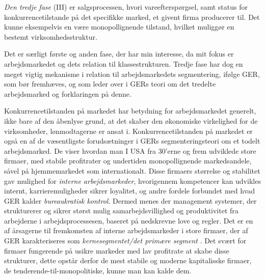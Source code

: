 \emph{Den tredje fase} (III) er salgsprocessen, hvori vareefterspørgsel,  samt status for konkurrencetilstande på det specifikke marked, et givent firma producerer til. Det kunne eksempelvis en være monopollignende tilstand, hvilket muliggør en bestemt virksomhedsstruktur. 

Det er særligt første og anden fase, der har min interesse, da mit fokus er arbejdsmarkedet og dets relation til klassestrukturen. Tredje fase har dog en meget vigtig mekanisme i relation til arbejdsmarkedets segmentering, ifølge GER, som bør fremhæves, og som leder over i GERs teori om det tredelte arbejdsmarked og forklaringen på denne.

Konkurrencetilstanden på markedet har betydning for arbejdsmarkedet generelt, ikke bare af den åbenlyse grund, at det skaber den økonomiske virkelighed for de virksomheder, lønmodtagerne er ansat i. Konkurrencetilstanden på markedet er også en af de væsentligste forudsætninger i GERs segmenteringsteori om et todelt arbejdsmarked. De viser hvordan man I USA fra 30'erne og frem udviklede store firmaer, med stabile profitrater og undertiden monopollignende markedsandele, såvel på hjemmemarkedet som internationalt. Disse firmaers størrelse og stabilitet gav mulighed for \emph{interne arbejdsmarkeder}, hvorigennem kompetencer kan udvikles internt, karrieremuligheder sikrer loyalitet, og andre fordele forbundet med hvad GER kalder \emph{bureaukratisk kontrol}. Dermed menes der management systemer, der strukturerer og sikrer størst mulig samarbejdsvillighed og produktivitet fra arbejderne i arbejdsprocessesen, baseret på nedskrevne love og regler. Det er en af årsagerne til fremkomsten af interne arbejdsmarkeder i store firmaer, der af GER karakteriseres som \emph{kernesegmentet/det primære segment} \parencite[187]{Gordon1982}. Det svært for firmaer fungerende på usikre markeder med lav profitrate at skabe disse strukturer, dette opstår derfor de mest stabile og moderne kapitalisske firmaer, de tenderende-til-monopolitiske, kunne man kan kalde dem.

